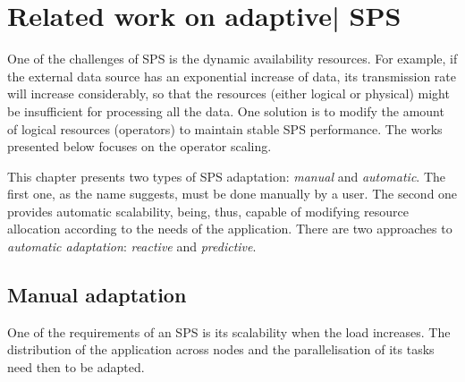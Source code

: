 %
\chapter{Related work on adaptive| SPS}
\label{related-work}
One of the challenges of SPS is the dynamic availability resources. For example, if the external data source has an exponential increase of data, its transmission rate will increase considerably, so that the resources (either logical or physical) might be insufficient for processing all the data. One solution is to modify the amount of logical resources (operators) to maintain stable SPS performance. The works presented below focuses on the operator scaling.

This chapter presents two types of SPS adaptation: \textit{manual} and \textit{automatic}. The first one, as the name suggests, must be done manually by a user. The second one provides automatic scalability, being, thus, capable of modifying resource allocation according to the needs of the application. There are two approaches to \textit{automatic adaptation}: \textit{reactive} and \textit{predictive}.

\section{Manual adaptation}
\label{rw-manual}
One of the requirements of an SPS is its scalability when the load increases. The distribution of the application across nodes and the parallelisation of its tasks need then to be adapted.

